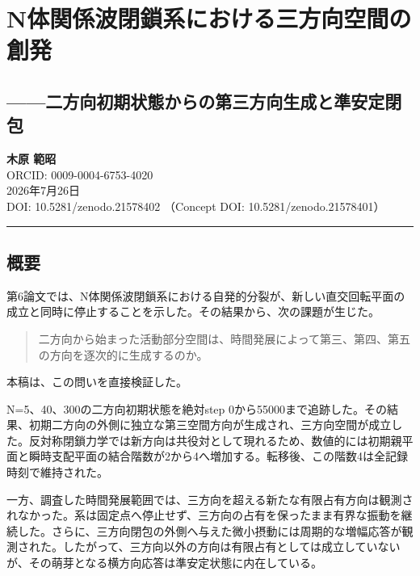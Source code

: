\documentclass[
  a4paper,
]{ltjsarticle}
\author{}
\date{}
\begin{document}
\section{N体関係波閉鎖系における三方向空間の創発}\label{nux4f53ux95a2ux4fc2ux6ce2ux9589ux9396ux7cfbux306bux304aux3051ux308bux4e09ux65b9ux5411ux7a7aux9593ux306eux5275ux767a}

\subsection{------二方向初期状態からの第三方向生成と準安定閉包}\label{ux4e8cux65b9ux5411ux521dux671fux72b6ux614bux304bux3089ux306eux7b2cux4e09ux65b9ux5411ux751fux6210ux3068ux6e96ux5b89ux5b9aux9589ux5305}

\textbf{木原 範昭}\\
ORCID: 0009-0004-6753-4020\\
2026年7月26日\\
DOI: 10.5281/zenodo.21578402 （Concept DOI: 10.5281/zenodo.21578401）

\begin{center}\rule{0.5\linewidth}{0.5pt}\end{center}

\subsection{概要}\label{ux6982ux8981}

第6論文では、N体関係波閉鎖系における自発的分裂が、新しい直交回転平面の成立と同時に停止することを示した。その結果から、次の課題が生じた。

\begin{quote}
二方向から始まった活動部分空間は、時間発展によって第三、第四、第五の方向を逐次的に生成するのか。
\end{quote}

本稿は、この問いを直接検証した。

N=5、40、300の二方向初期状態を絶対step
0から55000まで追跡した。その結果、初期二方向の外側に独立な第三空間方向が生成され、三方向空間が成立した。反対称閉鎖力学では新方向は共役対として現れるため、数値的には初期親平面と瞬時支配平面の結合階数が2から4へ増加する。転移後、この階数4は全記録時刻で維持された。

一方、調査した時間発展範囲では、三方向を超える新たな有限占有方向は観測されなかった。系は固定点へ停止せず、三方向の占有を保ったまま有界な振動を継続した。さらに、三方向閉包の外側へ与えた微小摂動には周期的な増幅応答が観測された。したがって、三方向以外の方向は有限占有としては成立していないが、その萌芽となる横方向応答は準安定状態に内在している。
\end{document}

